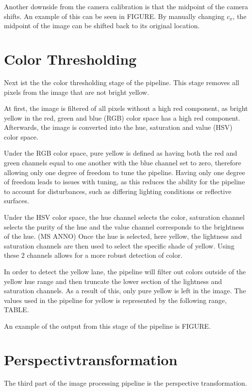 \documentclass[arbeit=studie,oneside,BCOR=12mm]{ArbeitRST}
\begin{document}
Another downside from the camera calibration is that the midpoint of the camera
shifts. An example of this can be seen in FIGURE. By manually
changing $c_x$, the midpoint of the image can be shifted back to its 
original location.

\section{\glqq Color Thresholding\grqq}

Next ist the the color thresholding stage of the pipeline. This stage removes
all pixels from the image that are not bright yellow.

At first, the image is filtered of all pixels without a high red component, as
bright yellow in the red, green and blue (RGB) color space has a high red
component. Afterwards, the image is converted into the hue, saturation and
value (HSV) color space. 

Under the RGB color space, pure yellow is defined as having both the red and
green channels equal to one another with the blue channel set to zero,
therefore allowing only one degree of freedom to tune the pipeline.  Having
only one degree of freedom leads to issues with tuning, as this reduces the
ability for the pipeline to account for disturbances, such as differing
lighting conditions or reflective surfaces.

Under the HSV color space, the hue channel selects the color, saturation
channel selects the purity of the hue and the value channel corresponds to the
brightness of the hue. (MS ANNO) Once the hue is selected, here yellow, the
lightness and saturation channels are then used to select the specific shade of
yellow. Using these 2 channels allows for a more robust detection of color.

In order to detect the yellow lane, the pipeline will filter out colors outside
of the yellow hue range and then truncate the lower section of the lightness
and saturation channels. As a result of this, only pure yellow is left in the
image. The values used in the pipeline for yellow is represented by the
following range, TABLE.

An example of the output from this stage of the pipeline is FIGURE.

\section{Perspectivtransformation}

The third part of the image processing pipeline is the perspective 
transformation. 
\end{document}
